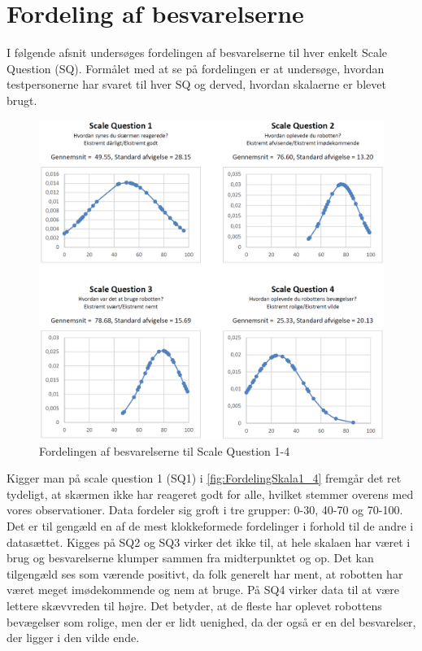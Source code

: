 \section{Fordeling af besvarelserne}
\label{TestAfSkalaFordelingAfBesvarelserne}
%
I følgende afsnit undersøges fordelingen af besvarelserne til hver enkelt Scale Question (SQ). Formålet med at se på fordelingen er at undersøge, hvordan testpersonerne har svaret til hver SQ og derved, hvordan skalaerne er blevet brugt. 
%
\begin{figure}[H]
\centering
\includegraphics[width =\textwidth]{Figure/DatabehandlingSkalaer/FordelingSkala1_4} 
\caption{Fordelingen af besvarelserne til Scale Question 1-4}
\label{fig:FordelingSkala1_4}
\end{figure}
\noindent
%
Kigger man på scale question 1 (SQ1) i \autoref{fig:FordelingSkala1_4} fremgår det ret tydeligt, at skærmen ikke har reageret godt for alle, hvilket stemmer overens med vores observationer. Data fordeler sig groft i tre grupper: 0-30, 40-70 og 70-100. Det er til gengæld en af de mest klokkeformede fordelinger i forhold til de andre i datasættet. Kigges på SQ2 og SQ3 virker det ikke til, at hele skalaen har været i brug og besvarelserne klumper sammen fra midterpunktet og op. Det kan tilgengæld ses som værende positivt, da folk generelt har ment, at robotten har været meget imødekommende og nem at bruge. På SQ4 virker data til at være lettere skævvreden til højre. Det betyder, at de fleste har oplevet robottens bevægelser som rolige, men der er lidt uenighed, da der også er en del besvarelser, der ligger i den vilde ende.
